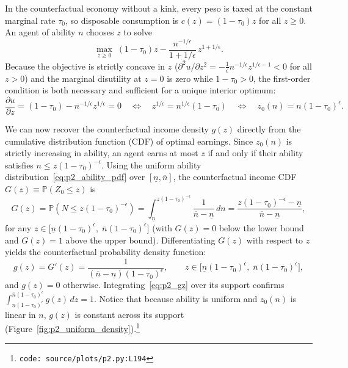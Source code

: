 In the counterfactual economy without a kink, every peso is taxed at the constant marginal rate $\tau_0$, so disposable consumption is $c(z) = (1-\tau_0)z$ for all $z \ge 0$. An agent of ability $n$ chooses $z$ to solve
\begin{equation}
\max_{z \ge 0} \; (1-\tau_0)z - \frac{n^{-1/\epsilon}}{1 + 1/\epsilon}\,z^{1 + 1/\epsilon}.
\end{equation}
Because the objective is strictly concave in $z$ ($\partial^2 u / \partial z^2 = -\frac{1}{\epsilon} n^{-1/\epsilon} z^{1/\epsilon - 1} < 0$ for all $z > 0$) and the marginal disutility at $z = 0$ is zero while $1-\tau_0 > 0$, the first-order condition is both necessary and sufficient for a unique interior optimum:
\begin{equation}
\frac{\partial u}{\partial z} = (1-\tau_0) - n^{-1/\epsilon} z^{1/\epsilon} = 0
\quad\Longleftrightarrow\quad
z^{1/\epsilon} = n^{1/\epsilon}(1-\tau_0)
\quad\Longleftrightarrow\quad
z_0(n) = n(1-\tau_0)^\epsilon.
\label{eq:p2_z0}
\end{equation}

We can now recover the counterfactual income density $g(z)$ directly from the cumulative distribution function (CDF) of optimal earnings. Since $z_0(n)$ is strictly increasing in ability, an agent earns at most $z$ if and only if their ability satisfies $n \le z(1-\tau_0)^{-\epsilon}$. Using the uniform ability distribution~\eqref{eq:p2_ability_pdf} over $[\underline{n}, \overline{n}]$, the counterfactual income CDF $G(z) \equiv \mathbb{P}(Z_0 \le z)$ is
\begin{equation}
G(z) = \mathbb{P}\!\left(N \le z(1-\tau_0)^{-\epsilon}\right)
= \int_{\underline{n}}^{z(1-\tau_0)^{-\epsilon}} \frac{1}{\overline{n}-\underline{n}}\,dn
= \frac{z(1-\tau_0)^{-\epsilon} - \underline{n}}{\overline{n}-\underline{n}},
\end{equation}
for any $z \in \big[\underline{n}(1-\tau_0)^\epsilon,\; \overline{n}(1-\tau_0)^\epsilon\big]$ (with $G(z) = 0$ below the lower bound and $G(z) = 1$ above the upper bound). Differentiating $G(z)$ with respect to $z$ yields the counterfactual probability density function:
\begin{equation}
g(z) = G'(z) = \frac{1}{(\overline{n}-\underline{n})(1-\tau_0)^\epsilon},
\qquad z \in \big[\underline{n}(1-\tau_0)^\epsilon,\; \overline{n}(1-\tau_0)^\epsilon\big],
\label{eq:p2_gz}
\end{equation}
and $g(z) = 0$ otherwise. Integrating~\eqref{eq:p2_gz} over its support confirms $\int_{\underline{n}(1-\tau_0)^\epsilon}^{\overline{n}(1-\tau_0)^\epsilon} g(z)\,dz = 1$. Notice that because ability is uniform and $z_0(n)$ is linear in $n$, $g(z)$ is constant across its support (Figure~\ref{fig:p2_uniform_density}).\footnote{\texttt{code: source/plots/p2.py:L194}}

